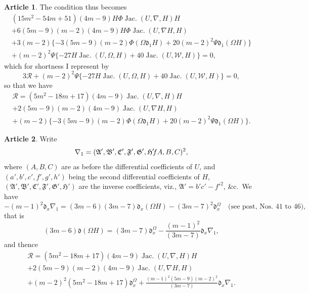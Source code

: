 \documentclass[12pt,a4paper]{article}
\theoremstyle{definition}
\newtheorem{art}{Article}[section]
\DeclareMathOperator{\Jac}{Jac.}
\begin{document}
\begin{art}
The condition thus becomes
\begin{multline*}
(15m^2 - 54m + 51)(4m - 9)H\Phi\Jac(U, \nabla, H)H \\
+ 6(5m - 9)(m - 2)(4m - 9)H\Phi\Jac(U, \nabla H, H) \\
+ 3(m - 2)\{-3(5m - 9)(m - 2)\Phi(\Omega\mathfrak{d}_1 H) + 20(m - 2)^2\Psi\mathfrak{d}_1(\Omega H)\} \\
+ (m - 2)^2\Psi\{-27H\Jac(U, \Omega, H) + 40\Jac(U, \mathcal{W}, H)\} = 0,
\end{multline*}
which for shortness I represent by
\[
3\mathcal{R} + (m - 2)^2\Psi\{-27H\Jac(U, \Omega, H) + 40\Jac(U, \mathcal{W}, H)\} = 0,
\]
so that we have
\begin{multline*}
\mathcal{R} = (5m^2 - 18m + 17)(4m - 9)\Jac(U, \nabla, H)H \\
+ 2(5m - 9)(m - 2)(4m - 9)\Jac(U, \nabla H, H) \\
+ (m - 2)\{-3(5m - 9)(m - 2)\Phi(\Omega\mathfrak{d}_1 H) + 20(m - 2)^2\Psi\mathfrak{d}_1(\Omega H)\}.
\end{multline*}
\end{art}

\begin{art}
Write
\[
\nabla_1 = (\mathfrak{A}', \mathfrak{B}', \mathfrak{C}', \mathfrak{F}', \mathfrak{G}', \mathfrak{H}' \hspace{-2pt} fA, B, C)^2,
\]
where $(A, B, C)$ are as before the differential coefficients of $U$, and $(a', b', c', f', g', h')$ being the second differential coefficients of $H$, $(\mathfrak{A}', \mathfrak{B}', \mathfrak{C}', \mathfrak{F}', \mathfrak{G}', \mathfrak{H}')$ are the inverse coefficients, viz., $\mathfrak{A}' = b'c' - f'^2$, \&c.\ We have
\[
-(m - 1)^2\mathfrak{d}_x\nabla_1 = (3m - 6)(3m - 7)\mathfrak{d}_x(\Omega H) - (3m - 7)^2\mathfrak{d}_x^\Omega \quad \text{(see post, Nos.\ 41 to 46)},
\]
that is
\[
(3m - 6)\mathfrak{d}(\Omega H) = (3m - 7)\mathfrak{d}_x^\Omega - \frac{(m - 1)^2}{(3m - 7)}\mathfrak{d}_x\nabla_1,
\]
and thence
\begin{multline*}
\mathcal{R} = (5m^2 - 18m + 17)(4m - 9)\Jac(U, \nabla, H)H \\
+ 2(5m - 9)(m - 2)(4m - 9)\Jac(U, \nabla H, H) \\
+ (m - 2)^2(5m^2 - 18m + 17)\mathfrak{d}_x^\Omega + \frac{(m - 1)^2(5m - 9)(m - 2)^2}{(3m - 7)}\mathfrak{d}_x\nabla_1.
\end{multline*}
\end{art}
\end{document}
